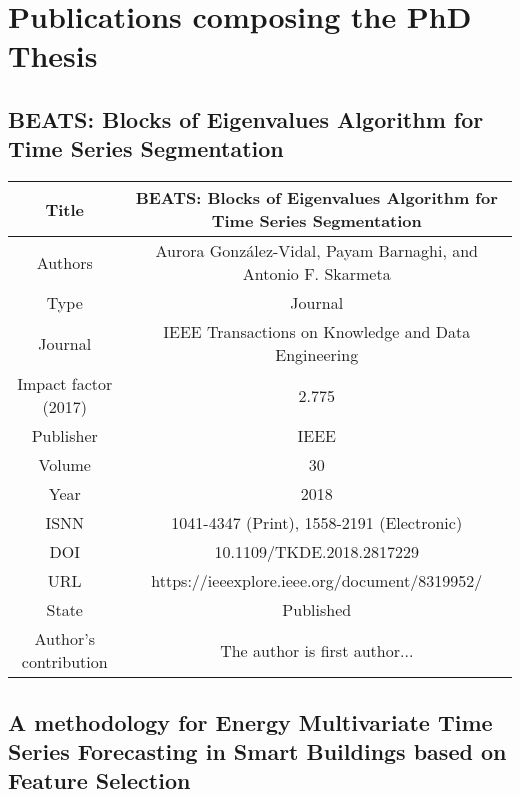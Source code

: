 %
%

\let\textcircled=\pgftextcircled
\chapter{Publications composing the PhD Thesis}
\label{chap:pub}


\section{BEATS: Blocks of Eigenvalues Algorithm for Time Series Segmentation}
\label{sec:BEATS}



\begin{table}[ht]
\centering
\begin{tabular}{c|c}
\hline
Title & BEATS: Blocks of Eigenvalues Algorithm for Time Series Segmentation \\
\hline
\rowcolor{LightCyan}
Authors & Aurora González-Vidal, Payam Barnaghi, and Antonio F. Skarmeta \\
Type & Journal \\
\rowcolor{LightCyan}
Journal & IEEE Transactions on Knowledge and Data Engineering \\
Impact factor (2017)& 2.775 \\
\rowcolor{LightCyan}
Publisher & IEEE \\
Volume & 30  \\
\rowcolor{LightCyan}
Year & 2018 \\
ISNN& 1041-4347 (Print), 1558-2191 (Electronic) \\
\rowcolor{LightCyan}
DOI&  10.1109/TKDE.2018.2817229  \\
URL & https://ieeexplore.ieee.org/document/8319952/ \\
\rowcolor{LightCyan}
State & Published \\
Author's contribution & The author is first author... \\
\hline
\end{tabular}
\end{table}
 

 

\section{A methodology for Energy Multivariate Time Series Forecasting in Smart Buildings based on Feature Selection}
\label{sec:FS}

